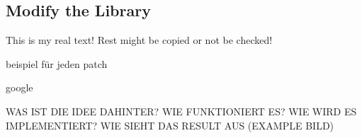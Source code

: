 \subsection{Modify the Library} \label{subsection:counter-modifications-library}
This is my real text! Rest might be copied or not be checked!


beispiel für jeden patch

google

WAS IST DIE IDEE DAHINTER? WIE FUNKTIONIERT ES? WIE WIRD ES IMPLEMENTIERT? WIE SIEHT DAS RESULT AUS (EXAMPLE BILD)\newline
